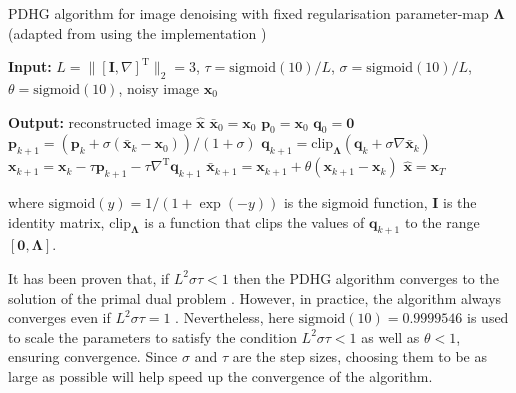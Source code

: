 \documentclass[12pt]{article}
\begin{document}
\begin{algorithm}[H]
\caption{PDHG algorithm for image denoising with fixed regularisation parameter-map $\boldsymbol{\Lambda}$ (adapted from \cite{kofler2023learning} using the implementation \cite{dyn_img_pdhg_code})}
\begin{algorithmic}[1]

\STATE \textbf{Input:} 
$L = \| [\mathbf{I}, \nabla]^\text{T} \|_2 = 3$, 
$\tau = \text{sigmoid}(10) / L$, 
$\sigma = \text{sigmoid}(10) / L$, 
$\theta = \text{sigmoid}(10)$, 
noisy image $\mathbf{x}_0$

\STATE \textbf{Output:} reconstructed image $\hat{\mathbf{x}}$
\STATE $\bar{\mathbf{x}}_0 = \mathbf{x}_0$
\STATE $\mathbf{p}_0 = \mathbf{x}_0$
\STATE $\mathbf{q}_0 = \mathbf{0}$
    \STATE $\mathbf{p}_{k+1} = \left(\mathbf{p}_k + \sigma ( \bar{\mathbf{x}}_k - \mathbf{x}_0)\right) / (1 + \sigma)$
    \STATE $\mathbf{q}_{k+1} = \text{clip}_{\boldsymbol{\Lambda}} \left(\mathbf{q}_k + \sigma \nabla \bar{\mathbf{x}}_k \right)$
    \STATE $\mathbf{x}_{k+1} = \mathbf{x}_k - \tau \mathbf{p}_{k+1} - \tau \nabla^\text{T} \mathbf{q}_{k+1}$
    \STATE $\bar{\mathbf{x}}_{k+1} = \mathbf{x}_{k+1} + \theta (\mathbf{x}_{k+1} - \mathbf{x}_k)$
\ENDFOR
\STATE $\hat{\mathbf{x}} = \mathbf{x}_T$
\end{algorithmic}
\end{algorithm}

where 
$\text{sigmoid}(y) = 1 / (1 + \exp(-y))$ is the sigmoid function,
$\mathbf{I}$ is the identity matrix, $\text{clip}_{\boldsymbol{\Lambda}}$ is a function that clips the values of $\mathbf{q}_{k+1}$ to the range $[\mathbf{0}, \boldsymbol{\Lambda}]$.

It has been proven that, if $L^2 \sigma \tau < 1$ then the PDHG algorithm converges to the solution of the primal dual problem \cite{chambolle_pock_2011}.
However, in practice, the algorithm always converges even if $L^2 \sigma \tau = 1$ \cite{sidky_2012}.
Nevertheless, here $\text{sigmoid}(10) = 0.9999546$ is used to scale the parameters to satisfy the condition $L^2 \sigma \tau < 1$ as well as $\theta < 1$, ensuring convergence.
Since $\sigma$ and $\tau$ are the step sizes, choosing them to be as large as possible will help speed up the convergence of the algorithm.
\end{document}

